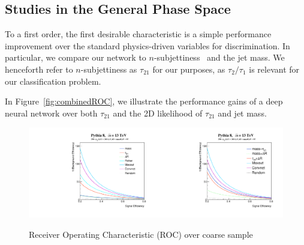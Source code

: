 
\subsection{Studies in the General Phase Space} %
\label{sub:coarse_studies}

To a first order, the first desirable characteristic is a simple performance improvement over the standard physics-driven variables for discrimination. In particular, we compare our network to $n$-subjettiness~\cite{nsub} and the jet mass. We henceforth refer to $n$-subjettiness as $\tau_{21}$ for our purposes, as $\tau_{2}/\tau_{1}$ is relevant for our classification problem.

In Figure~\ref{fig:combinedROC}, we illustrate the performance gains of a deep neural network over both $\tau_{21}$ and the 2D likelihood of $\tau_{21}$ and jet mass. 


\begin{figure}[!htbp]
  \centering
  \includegraphics[width=0.5\textwidth]{figures/ROC_1}\includegraphics[width=0.5\textwidth]{figures/ROC_2}
  \caption{Receiver Operating Characteristic (ROC) over coarse sample}
  \label{fig:combinedROC1}
\end{figure}

